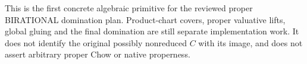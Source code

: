 \begin{remark}
This is the first concrete algebraic primitive for the reviewed proper
BIRATIONAL domination plan.  Product-chart covers, proper valuative lifts,
global gluing and the final domination are still separate implementation work.
It does not identify the original possibly nonreduced $C$ with its image, and
does not assert arbitrary proper Chow or native properness.
\end{remark}
